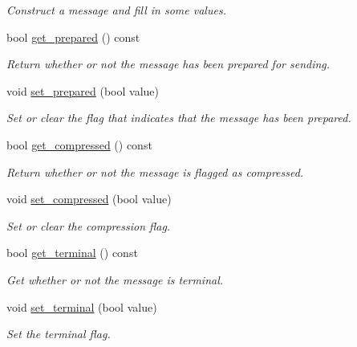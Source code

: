 \begin{DoxyCompactItemize}
\begin{DoxyCompactList}\small\item\em Construct a message and fill in some values. \end{DoxyCompactList}\item 
bool \hyperlink{classwebsocketpp_1_1message__buffer_1_1message_ac1f947fbff19cf93d6fc19e21aff0e10}{get\+\_\+prepared} () const
\begin{DoxyCompactList}\small\item\em Return whether or not the message has been prepared for sending. \end{DoxyCompactList}\item 
void \hyperlink{classwebsocketpp_1_1message__buffer_1_1message_a9b17bf5adb8607c44774a96b340ee55b}{set\+\_\+prepared} (bool value)
\begin{DoxyCompactList}\small\item\em Set or clear the flag that indicates that the message has been prepared. \end{DoxyCompactList}\item 
bool \hyperlink{classwebsocketpp_1_1message__buffer_1_1message_a2ed58d11ccdedad8b6f9123897cff071}{get\+\_\+compressed} () const
\begin{DoxyCompactList}\small\item\em Return whether or not the message is flagged as compressed. \end{DoxyCompactList}\item 
void \hyperlink{classwebsocketpp_1_1message__buffer_1_1message_addf63a081902e981a293823606b548cb}{set\+\_\+compressed} (bool value)
\begin{DoxyCompactList}\small\item\em Set or clear the compression flag. \end{DoxyCompactList}\item 
bool \hyperlink{classwebsocketpp_1_1message__buffer_1_1message_a45e39497d283ec38d1360b60a5879e32}{get\+\_\+terminal} () const
\begin{DoxyCompactList}\small\item\em Get whether or not the message is terminal. \end{DoxyCompactList}\item 
void \hyperlink{classwebsocketpp_1_1message__buffer_1_1message_abcc812dfce52ff72f57a0d0908d33867}{set\+\_\+terminal} (bool value)
\begin{DoxyCompactList}\small\item\em Set the terminal flag. \end{DoxyCompactList}\item 

\end{DoxyCompactItemize}
